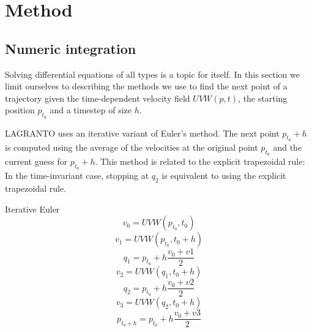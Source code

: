 \chapter{Method}

\section{Numeric integration}\label{sec:integrator}
Solving differential equations of all types is a topic for itself. In this section we limit ourselves to describing the methods we use to find the next point of a trajectory given the time-dependent velocity field $UVW(p,t)$, the starting position $p_{t_0}$ and a timestep of size $h$.

LAGRANTO uses an iterative variant of Euler's method. The next point $p_{t_0}+h$ is computed using the average of the velocities at the original point $p_{t_0}$ and the current guess for $p_{t_0}+h$. This method is related to the explicit trapezoidal rule: In the time-invariant case, stopping at $q_2$ is equivalent to using the explicit trapezoidal rule.


% 

Iterative Euler
\begin{equation}
	v_0 = UVW(p_{t_0}, t_0)
\end{equation}
\begin{equation}
	v_1 = UVW(p_{t_0}, t_0 + h)
\end{equation}
\begin{equation}
	q_1 = p_{t_0} + h \frac{ v_0  + v1}{2}
\end{equation}
\begin{equation}
	v_2 = UVW(q_1, t_0 + h)
\end{equation}
\begin{equation}
	q_2 = p_{t_0} + h \frac{ v_0  + v2}{2}
\end{equation}
\begin{equation}
	v_3 = UVW(q_2, t_0 + h)
\end{equation}
\begin{equation}
	p_{t_0 + h} = p_{t_0} + h \frac{ v_0  + v3}{2}
\end{equation}

